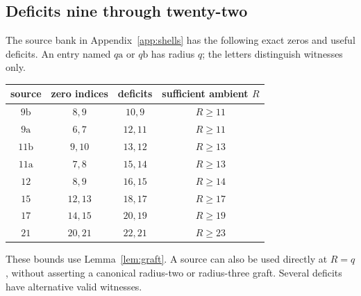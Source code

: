\documentclass[11pt,a4paper]{article}
\theoremstyle{definition}\newtheorem{definition}[theorem]{Definition}
\theoremstyle{remark}\newtheorem{remark}[theorem]{Remark}
\begin{document}
\subsection{Deficits nine through twenty-two}
The source bank in Appendix~\ref{app:shells} has the following exact
zeros and useful deficits. An entry named $q\mathrm a$ or $q\mathrm b$
has radius $q$; the letters distinguish witnesses only.
\begin{center}\begin{tabular}{c c c c}\toprule
 source & zero indices & deficits & sufficient ambient $R$\\\midrule
 $9\mathrm b$ & $8,9$ & $10,9$ & $R\ge11$\\
 $9\mathrm a$ & $6,7$ & $12,11$ & $R\ge11$\\
 $11\mathrm b$ & $9,10$ & $13,12$ & $R\ge13$\\
 $11\mathrm a$ & $7,8$ & $15,14$ & $R\ge13$\\
 $12$ & $8,9$ & $16,15$ & $R\ge14$\\
 $15$ & $12,13$ & $18,17$ & $R\ge17$\\
 $17$ & $14,15$ & $20,19$ & $R\ge19$\\
 $21$ & $20,21$ & $22,21$ & $R\ge23$\\\bottomrule
\end{tabular}\end{center}
These bounds use Lemma~\ref{lem:graft}. A source can also be used
directly at $R=q$, without asserting a canonical radius-two or
radius-three graft. Several deficits have alternative valid witnesses.
\end{document}
